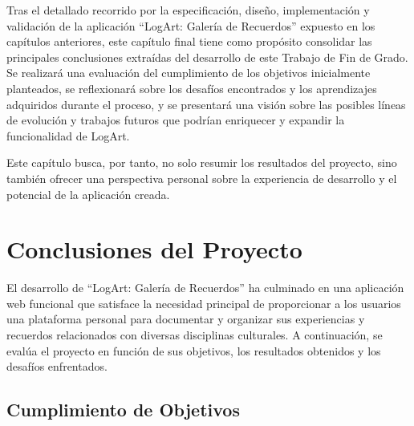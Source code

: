 Tras el detallado recorrido por la especificación, diseño, implementación y validación de la aplicación ``LogArt: Galería de Recuerdos'' expuesto en los capítulos anteriores, este capítulo final tiene como propósito consolidar las principales conclusiones extraídas del desarrollo de este Trabajo de Fin de Grado. Se realizará una evaluación del cumplimiento de los objetivos inicialmente planteados, se reflexionará sobre los desafíos encontrados y los aprendizajes adquiridos durante el proceso, y se presentará una visión sobre las posibles líneas de evolución y trabajos futuros que podrían enriquecer y expandir la funcionalidad de LogArt.

Este capítulo busca, por tanto, no solo resumir los resultados del proyecto, sino también ofrecer una perspectiva personal sobre la experiencia de desarrollo y el potencial de la aplicación creada.

\section{Conclusiones del Proyecto}
\label{sec:conclusionesProyecto}

El desarrollo de ``LogArt: Galería de Recuerdos'' ha culminado en una aplicación web funcional que satisface la necesidad principal de proporcionar a los usuarios una plataforma personal para documentar y organizar sus experiencias y recuerdos relacionados con diversas disciplinas culturales. A continuación, se evalúa el proyecto en función de sus objetivos, los resultados obtenidos y los desafíos enfrentados.

\subsection{Cumplimiento de Objetivos}
\label{ssec:cumplimientoObjetivos}

